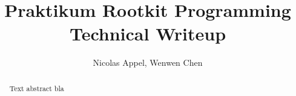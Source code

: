 \documentclass[a4paper,10pt]{scrreprt}
\title{Praktikum Rootkit Programming\\Technical Writeup}
\author{Nicolas Appel, Wenwen Chen}
\begin{document}
\maketitle
\begin{abstract}
Text abstract bla
\end{abstract}
\tableofcontents
\end{document}
